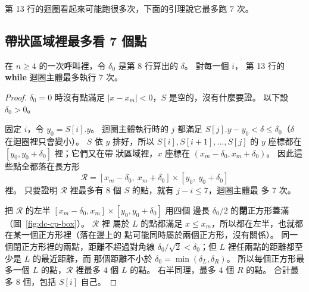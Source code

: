 第 13 行的迴圈看起來可能跑很多次，下面的引理說它最多跑 $7$ 次。

\subsection{帶狀區域裡最多看 7 個點}

\begin{lemma}
\label{lem:dc-seven}
在 $n \ge 4$ 的一次呼叫裡，令 $\delta_0$ 是第 8 行算出的 $\delta$。 對每一個 $i$，
第 13 行的 \textbf{while} 迴圈主體最多執行 $7$ 次。
\end{lemma}

\begin{proof}
$\delta_0 = 0$ 時沒有點滿足 $|x - x_m| < 0$，$S$ 是空的，沒有什麼要證。 以下設
$\delta_0 > 0$。

固定 $i$，令 $y_0 = S[i].y$。 迴圈主體執行時的 $j$ 都滿足 $S[j].y - y_0 < \delta
\le \delta_0$（$\delta$ 在迴圈裡只會變小）。 $S$ 依 $y$ 排好，所以
$S[i], S[i+1], \ldots, S[j]$ 的 $y$ 座標都在 $[y_0, y_0 + \delta_0]$ 裡；它們又在帶
狀區域裡，$x$ 座標在 $(x_m - \delta_0, x_m + \delta_0)$。 因此這些點全都落在長方形
\[
\mathcal{R} = [x_m - \delta_0,\ x_m + \delta_0] \times [y_0,\ y_0 + \delta_0]
\]
裡。 只要證明 $\mathcal{R}$ 裡最多有 $8$ 個 $S$ 的點，就有 $j - i \le 7$，迴圈主體最
多 $7$ 次。

把 $\mathcal{R}$ 的左半 $[x_m - \delta_0, x_m] \times [y_0, y_0 + \delta_0]$ 用四個
邊長 $\delta_0/2$ 的\textbf{閉}正方形蓋滿（圖~\ref{fig:dc-cp-box}）。 $\mathcal{R}$ 裡
屬於 $L$ 的點都滿足 $x \le x_m$，所以都在左半，也就都在某一個正方形裡（落在邊上的
點可能同時屬於兩個正方形，沒有關係）。 同一個閉正方形裡的兩點，距離不超過對角線
$\delta_0 / \sqrt{2} < \delta_0$；但 $L$ 裡任兩點的距離都至少是 $L$ 的最近距離，而
那個距離不小於 $\delta_0 = \min(\delta_L, \delta_R)$。 所以每個正方形最多一個 $L$
的點，$\mathcal{R}$ 裡最多 $4$ 個 $L$ 的點。 右半同理，最多 $4$ 個 $R$ 的點。 合計最
多 $8$ 個，包括 $S[i]$ 自己。
\end{proof}

